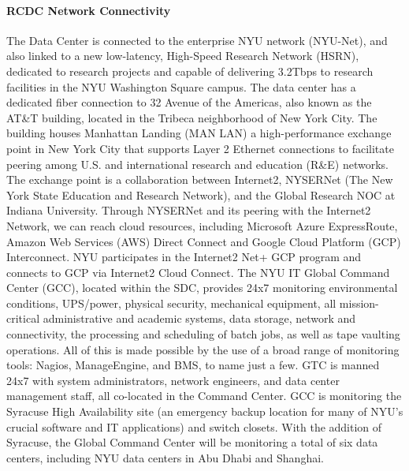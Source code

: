 \paragraph{RCDC Network Connectivity}
The Data Center is connected to the enterprise NYU network (NYU-Net), and also  linked to a new low-latency, High-Speed Research Network (HSRN), dedicated to research projects and capable of delivering 3.2Tbps to research facilities in the NYU Washington Square campus.  The data center has a dedicated fiber connection to 32 Avenue of the Americas, also known as the AT\&T building, located in the Tribeca neighborhood of New York City. The building houses Manhattan Landing (MAN LAN) a high-performance exchange point in New York City that supports Layer 2 Ethernet connections to facilitate peering among U.S. and international research and education (R\&E) networks. The exchange point is a collaboration between Internet2, NYSERNet (The New York State Education and Research Network), and the Global Research NOC at Indiana University. Through NYSERNet and its peering with the Internet2 Network, we can reach cloud resources, including Microsoft Azure ExpressRoute, Amazon Web Services (AWS) Direct Connect and Google Cloud Platform (GCP) Interconnect. NYU participates in the Internet2 Net+ GCP program and connects to GCP via Internet2 Cloud Connect. The NYU IT Global Command Center (GCC), located within the SDC, provides 24x7 monitoring environmental conditions, UPS/power, physical security, mechanical equipment, all mission-critical administrative and academic systems, data storage, network and connectivity, the processing and scheduling of batch jobs, as well as tape vaulting operations. All of this is made possible by the use of a broad range of monitoring tools: Nagios, ManageEngine, and BMS, to name just a few. GTC is manned 24x7 with system administrators, network engineers, and data center management staff, all co-located in the Command Center. GCC is monitoring the Syracuse High Availability site (an emergency backup location for many of NYU's crucial software and IT applications) and switch closets. With the addition of Syracuse, the Global Command Center will be monitoring a total of six data centers, including NYU data centers in Abu Dhabi and Shanghai.

